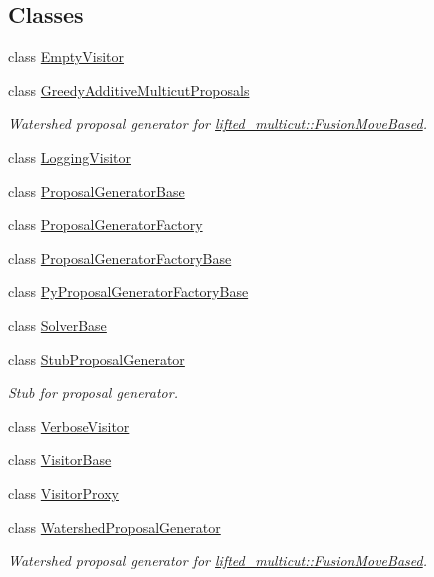 \subsection*{Classes}
\begin{DoxyCompactItemize}
\item 
class \hyperlink{classnifty_1_1graph_1_1optimization_1_1common_1_1EmptyVisitor}{Empty\+Visitor}
\item 
class \hyperlink{classnifty_1_1graph_1_1optimization_1_1common_1_1GreedyAdditiveMulticutProposals}{Greedy\+Additive\+Multicut\+Proposals}
\begin{DoxyCompactList}\small\item\em Watershed proposal generator for \hyperlink{classnifty_1_1graph_1_1lifted__multicut_1_1FusionMoveBased}{lifted\+\_\+multicut\+::\+Fusion\+Move\+Based}. \end{DoxyCompactList}\item 
class \hyperlink{classnifty_1_1graph_1_1optimization_1_1common_1_1LoggingVisitor}{Logging\+Visitor}
\item 
class \hyperlink{classnifty_1_1graph_1_1optimization_1_1common_1_1ProposalGeneratorBase}{Proposal\+Generator\+Base}
\item 
class \hyperlink{classnifty_1_1graph_1_1optimization_1_1common_1_1ProposalGeneratorFactory}{Proposal\+Generator\+Factory}
\item 
class \hyperlink{classnifty_1_1graph_1_1optimization_1_1common_1_1ProposalGeneratorFactoryBase}{Proposal\+Generator\+Factory\+Base}
\item 
class \hyperlink{classnifty_1_1graph_1_1optimization_1_1common_1_1PyProposalGeneratorFactoryBase}{Py\+Proposal\+Generator\+Factory\+Base}
\item 
class \hyperlink{classnifty_1_1graph_1_1optimization_1_1common_1_1SolverBase}{Solver\+Base}
\item 
class \hyperlink{classnifty_1_1graph_1_1optimization_1_1common_1_1StubProposalGenerator}{Stub\+Proposal\+Generator}
\begin{DoxyCompactList}\small\item\em Stub for proposal generator. \end{DoxyCompactList}\item 
class \hyperlink{classnifty_1_1graph_1_1optimization_1_1common_1_1VerboseVisitor}{Verbose\+Visitor}
\item 
class \hyperlink{classnifty_1_1graph_1_1optimization_1_1common_1_1VisitorBase}{Visitor\+Base}
\item 
class \hyperlink{classnifty_1_1graph_1_1optimization_1_1common_1_1VisitorProxy}{Visitor\+Proxy}
\item 
class \hyperlink{classnifty_1_1graph_1_1optimization_1_1common_1_1WatershedProposalGenerator}{Watershed\+Proposal\+Generator}
\begin{DoxyCompactList}\small\item\em Watershed proposal generator for \hyperlink{classnifty_1_1graph_1_1lifted__multicut_1_1FusionMoveBased}{lifted\+\_\+multicut\+::\+Fusion\+Move\+Based}. \end{DoxyCompactList}\end{DoxyCompactItemize}
